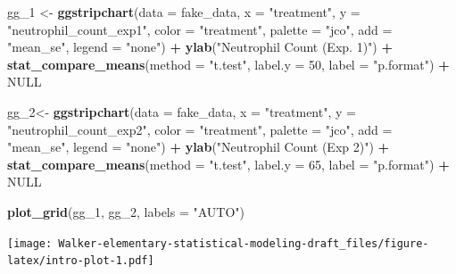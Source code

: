 \documentclass[]{book}
\newenvironment{Shaded}{\begin{snugshade}}{\end{snugshade}}
\newcommand{\DataTypeTok}[1]{\textcolor[rgb]{0.13,0.29,0.53}{#1}}
\newcommand{\DecValTok}[1]{\textcolor[rgb]{0.00,0.00,0.81}{#1}}
\newcommand{\KeywordTok}[1]{\textcolor[rgb]{0.13,0.29,0.53}{\textbf{#1}}}
\newcommand{\NormalTok}[1]{#1}
\newcommand{\OperatorTok}[1]{\textcolor[rgb]{0.81,0.36,0.00}{\textbf{#1}}}
\newcommand{\OtherTok}[1]{\textcolor[rgb]{0.56,0.35,0.01}{#1}}
\newcommand{\StringTok}[1]{\textcolor[rgb]{0.31,0.60,0.02}{#1}}
\begin{document}
\begin{Shaded}
\begin{Highlighting}[]
\NormalTok{gg_}\DecValTok{1}\NormalTok{ <-}\StringTok{ }\KeywordTok{ggstripchart}\NormalTok{(}\DataTypeTok{data =}\NormalTok{ fake_data,}
                \DataTypeTok{x =} \StringTok{"treatment"}\NormalTok{,}
                \DataTypeTok{y =} \StringTok{"neutrophil_count_exp1"}\NormalTok{,}
                \DataTypeTok{color =} \StringTok{"treatment"}\NormalTok{,}
                \DataTypeTok{palette =} \StringTok{"jco"}\NormalTok{,}
                \DataTypeTok{add =} \StringTok{"mean_se"}\NormalTok{,}
                \DataTypeTok{legend =} \StringTok{"none"}\NormalTok{) }\OperatorTok{+}
\StringTok{    }\KeywordTok{ylab}\NormalTok{(}\StringTok{"Neutrophil Count (Exp. 1)"}\NormalTok{) }\OperatorTok{+}
\StringTok{  }\KeywordTok{stat_compare_means}\NormalTok{(}\DataTypeTok{method =} \StringTok{"t.test"}\NormalTok{,}
                     \DataTypeTok{label.y =} \DecValTok{50}\NormalTok{,}
                     \DataTypeTok{label =} \StringTok{"p.format"}\NormalTok{) }\OperatorTok{+}
\StringTok{    }\OtherTok{NULL}

\NormalTok{gg_}\DecValTok{2}\NormalTok{<-}\StringTok{ }\KeywordTok{ggstripchart}\NormalTok{(}\DataTypeTok{data =}\NormalTok{ fake_data,}
                \DataTypeTok{x =} \StringTok{"treatment"}\NormalTok{,}
                \DataTypeTok{y =} \StringTok{"neutrophil_count_exp2"}\NormalTok{,}
                \DataTypeTok{color =} \StringTok{"treatment"}\NormalTok{,}
                \DataTypeTok{palette =} \StringTok{"jco"}\NormalTok{,}
                \DataTypeTok{add =} \StringTok{"mean_se"}\NormalTok{,}
                \DataTypeTok{legend =} \StringTok{"none"}\NormalTok{) }\OperatorTok{+}
\StringTok{  }\KeywordTok{ylab}\NormalTok{(}\StringTok{"Neutrophil Count (Exp 2)"}\NormalTok{) }\OperatorTok{+}
\StringTok{  }\KeywordTok{stat_compare_means}\NormalTok{(}\DataTypeTok{method =} \StringTok{"t.test"}\NormalTok{,}
                     \DataTypeTok{label.y =} \DecValTok{65}\NormalTok{,}
                     \DataTypeTok{label =} \StringTok{"p.format"}\NormalTok{) }\OperatorTok{+}
\OtherTok{NULL}

\KeywordTok{plot_grid}\NormalTok{(gg_}\DecValTok{1}\NormalTok{, gg_}\DecValTok{2}\NormalTok{, }\DataTypeTok{labels =} \StringTok{"AUTO"}\NormalTok{)}
\end{Highlighting}
\end{Shaded}

\texttt{[image: Walker-elementary-statistical-modeling-draft\_files/figure-latex/intro-plot-1.pdf]}
\end{document}

